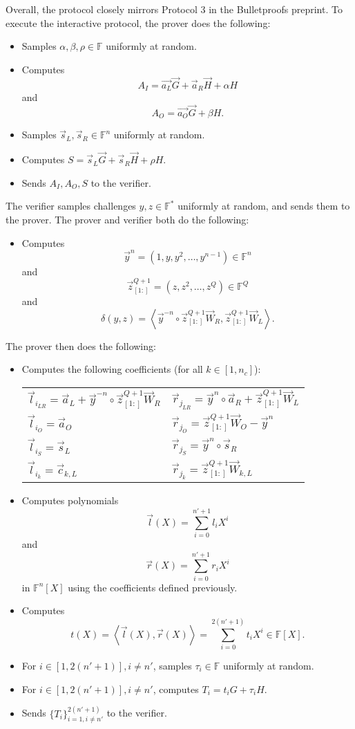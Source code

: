 \documentclass{article}
\newcommand{\FF}{\mathbb{F}}
\newcommand{\mat}[1]{\vec{#1}}
\newcommand{\zq}{\vec{z}^{Q+1}_{[1:]}}
\begin{document}
Overall, the protocol closely mirrors Protocol 3 in the Bulletproofs preprint.
To execute the interactive protocol, the prover does the following:
\begin{itemize}
	\item Samples $\alpha, \beta, \rho \in \FF$ uniformly at random.
	\item Computes
	$$A_I = \vec{a_L} \vec{G} + \vec{a}_R \vec{H} + \alpha H$$
	and
	$$A_O = \vec{a_O} \vec{G} + \beta H.$$
	\item Samples $\vec{s}_L, \vec{s}_R \in \FF^n$ uniformly at random.
	\item Computes $S = \vec{s}_L \vec{G} + \vec{s}_R \vec{H} + \rho H$.
	\item Sends $A_I, A_O, S$ to the verifier.
\end{itemize}
The verifier samples challenges $y, z \in \FF^*$ uniformly at random, and sends them to the prover.
The prover and verifier both do the following:
\begin{itemize}
	\item Computes
	$$\vec{y}^n = \left( 1, y, y^2, \ldots, y^{n-1} \right) \in \FF^n$$
	and
	$$\zq = \left( z, z^2, \ldots, z^Q \right) \in \FF^Q$$
	and
	$$\delta(y, z) = \left\langle \vec{y}^{-n} \circ \zq \mat{W}_R, \zq \mat{W}_L \right\rangle.$$
\end{itemize}
The prover then does the following:
\begin{itemize}
	\item Computes the following coefficients (for all $k \in [1, n_c]$):
	\begin{center}
		\begin{tabular}{ll}
		$\vec{l}_{i_{LR}} = \vec{a}_L + \vec{y}^{-n} \circ \zq \vec{W}_R$ & $\vec{r}_{j_{LR}} = \vec{y}^n \circ \vec{a}_R + \zq \vec{W}_L$ \\
		$\vec{l}_{i_O} = \vec{a}_O$ & $\vec{r}_{j_O} = \zq \vec{W}_O - \vec{y}^n$ \\
		$\vec{l}_{i_S} = \vec{s}_L$ & $\vec{r}_{j_S} = \vec{y}^n \circ \vec{s}_R$ \\
		$\vec{l}_{i_k} = \vec{c}_{k,L}$ & $\vec{r}_{j_k} = \zq \mat{W}_{k,L}$
		\end{tabular}
	\end{center}
	\item Computes polynomials
	$$\vec{l}(X) = \sum_{i=0}^{n' + 1} l_i X^i$$
	and
	$$\vec{r}(X) = \sum_{i=0}^{n' + 1} r_i X^i$$
	in $\FF^n[X]$ using the coefficients defined previously.
	\item Computes $$t(X) = \left\langle \vec{l}(X), \vec{r}(X) \right\rangle = \sum_{i=0}^{2(n' + 1)} t_i X^i \in \FF[X].$$
	\item For $i \in [1, 2(n' + 1)], i \neq n'$, samples $\tau_i \in \FF$ uniformly at random.
	\item For $i \in [1, 2(n' + 1)], i \neq n'$, computes $T_i = t_i G + \tau_i H$.
	\item Sends $\{ T_i \}_{i=1, i \neq n'}^{2(n' + 1)}$ to the verifier.
\end{itemize}
\end{document}

